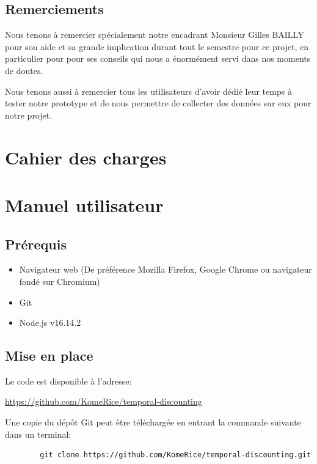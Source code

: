 \documentclass[a4paper, 12pt]{report}
\begin{document}
    \section{Remerciements}
    Nous tenons à remercier spécialement notre encadrant Monsieur Gilles BAILLY pour son aide et sa grande implication durant tout le semestre pour ce projet, en particulier pour pour ses conseils qui nous a énormément servi dans nos moments de doutes.
    
    Nous tenons aussi à remercier tous les utilisateurs d'avoir dédié leur temps à tester notre prototype et de nous 
    permettre de collecter des données sur eux pour notre projet.

    
    \printbibliography

    \appendix
        \chapter{Cahier des charges}
        
        
        \chapter{Manuel utilisateur}

        \section{Prérequis}
        \begin{itemize}
            \item Navigateur web (De préférence Mozilla Firefox, Google Chrome ou navigateur fondé sur Chromium)
            \item Git
            \item Node.js v16.14.2
        \end{itemize}
        \section{Mise en place}
        Le code est disponible à l'adresse: 
        
        
        \href{https://github.com/KomeRice/temporal-discounting}{https://github.com/KomeRice/temporal-discounting}
        
        
        Une copie du dépôt Git peut être téléchargée en entrant la commande suivante dans un terminal:
        
        \begin{verbatim}
        git clone https://github.com/KomeRice/temporal-discounting.git
        \end{verbatim}
        
\end{document}
